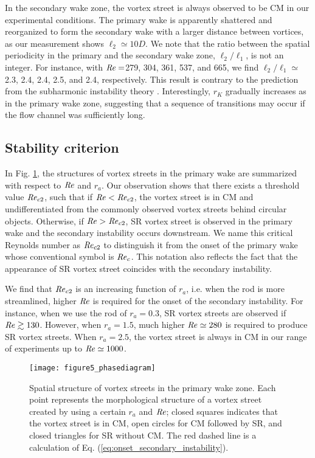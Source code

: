 \documentclass[english, aps, prl, longbibliography, preprint]{revtex4-1}
\newcommand\citepar\citep
\newcommand\Reynolds{{\it Re}}
\begin{document}
In the secondary wake zone, the vortex street is always observed to be CM in our experimental conditions.
The primary wake is apparently shattered and reorganized to form the secondary wake with a larger distance between vortices, as our measurement shows $\ell_{2}\simeq10D$. 
We note that the ratio between the spatial periodicity in the primary and the secondary wake zone, $\ell_{2}/\ell_{1}$, is not an integer.
For instance, with $\Reynolds=$279, 304, 361, 537, and 665, we find $\ell_{2}/\ell_{1}\simeq$2.3, 2.4, 2.4, 2.5, and 2.4, respectively. 
This result is contrary to the prediction from the subharmonic instability theory \citepar{Aref:1981tt, Meiburg:1987gz}. 
Interestingly, $r_K$ gradually increases as in the primary wake zone, suggesting that a sequence of transitions may occur if the flow channel was sufficiently long.

\subsection{Stability criterion}

In Fig. \ref{fig:phasediagram}, the structures of vortex streets in the primary wake are summarized with respect to $\Reynolds$ and $r_a$.
Our observation shows that there exists a threshold value $\Reynolds_{c2}$, such that if $\Reynolds<\Reynolds_{c2}$, the vortex street is in CM and undifferentiated from the commonly observed vortex streets behind circular objects.
Otherwise, if $\Reynolds>\Reynolds_{c2}$, SR vortex street is observed in the primary wake and the secondary instability occurs downstream.
We name this critical Reynolds number as $\Reynolds_{c2}$ to distinguish it from the onset of the primary wake whose conventional symbol is $\Reynolds_c$.
This notation also reflects the fact that the appearance of SR vortex street coincides with the secondary instability.

We find that $\Reynolds_{c2}$ is an increasing function of $r_a$, i.e. when the rod is more streamlined, higher $\Reynolds$ is required for the onset of the secondary instability.
For instance, when we use the rod of $r_a=0.3$, SR vortex streets are observed if $\Reynolds \gtrsim 130$.
However, when $r_a=1.5$, much higher $\Reynolds\simeq 280$ is required to produce SR vortex streets.
When $r_a=2.5$, the vortex street is always in CM in our range of experiments up to $\Reynolds\simeq 1000$.

\begin{figure}
\begin{centering}
\texttt{[image: figure5\_phasediagram]}
\par
\end{centering}
\caption{
Spatial structure of vortex streets in the primary wake zone. 
Each point represents the morphological structure of a vortex street created by using a certain $r_a$ and $\Reynolds$; closed squares indicates that the vortex street is in CM, open circles for CM followed by SR, and closed triangles for SR without CM.
The red dashed line is a calculation of Eq. (\ref{eq:onset_secondary_instability}).
\label{fig:phasediagram}}
\end{figure}
\end{document}
